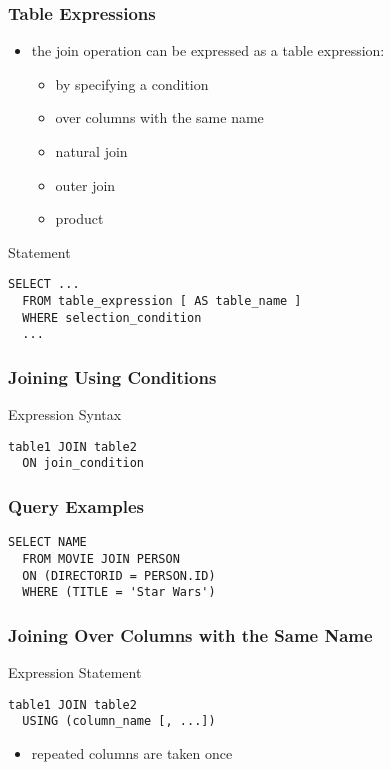 \documentclass[dvipsnames]{beamer}
\theoremstyle{plain}
\begin{document}
\begin{frame}[fragile]
  \frametitle{Table Expressions}

  \begin{itemize}
    \item the join operation can be expressed as a table expression:
    \begin{itemize}
      \item by specifying a condition
      \item over columns with the same name
      \item natural join
      \item outer join
      \item product
    \end{itemize}
  \end{itemize}

  \begin{block}{Statement}
    \begin{lstlisting}
SELECT ...
  FROM table_expression [ AS table_name ]
  WHERE selection_condition
  ...
    \end{lstlisting}
  \end{block}
\end{frame}

\begin{frame}[fragile]
  \frametitle{Joining Using Conditions}

  \begin{block}{Expression Syntax}
    \begin{lstlisting}
table1 JOIN table2
  ON join_condition
    \end{lstlisting}
  \end{block}
\end{frame}

\begin{frame}[fragile]
  \frametitle{Query Examples}

  \begin{example}
    \begin{lstlisting}
SELECT NAME
  FROM MOVIE JOIN PERSON
  ON (DIRECTORID = PERSON.ID)
  WHERE (TITLE = 'Star Wars')
    \end{lstlisting}
  \end{example}
\end{frame}

\begin{frame}[fragile]
  \frametitle{Joining Over Columns with the Same Name}

  \begin{block}{Expression Statement}
    \begin{lstlisting}
table1 JOIN table2
  USING (column_name [, ...])
    \end{lstlisting}
  \end{block}

  \begin{itemize}
    \item repeated columns are taken once
  \end{itemize}
\end{frame}
\end{document}
